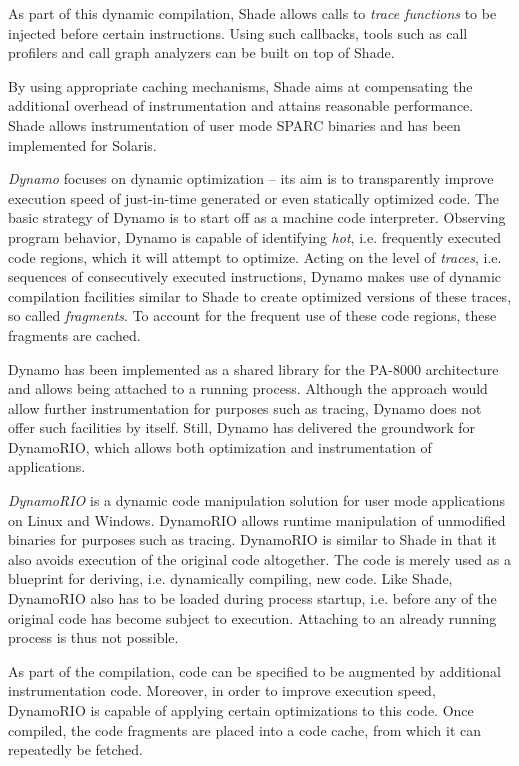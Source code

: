 As part of this dynamic compilation, Shade allows calls to \emph{trace functions} 
to be injected before certain instructions. Using such callbacks, tools such as 
call profilers and call graph analyzers can be built on top of Shade.

By using appropriate caching mechanisms, Shade aims at compensating the additional 
overhead of instrumentation and attains reasonable performance. Shade allows instrumentation
of user mode SPARC binaries and has been implemented for Solaris.

\emph{Dynamo} \cite{Dynamo00} focuses on dynamic optimization -- its aim is to transparently 
improve execution speed of just-in-time generated or even statically optimized 
code. The basic strategy of Dynamo is to start off as a machine code interpreter. 
Observing program behavior, Dynamo is capable of identifying \emph{hot}, 
i.e. frequently executed code regions, which it will attempt to optimize. 
Acting on the level of \emph{traces}, i.e. sequences of consecutively executed instructions, 
Dynamo makes use of dynamic compilation facilities similar to Shade to create optimized 
versions of these traces, so called \emph{fragments}. To account for the frequent use of 
these code regions, these fragments are cached.

Dynamo has been implemented as a shared library for the PA-8000 architecture 
and allows being attached to a running process. Although the 
approach would allow further instrumentation for purposes such as tracing,
Dynamo does not offer such facilities by itself. Still, Dynamo has delivered the groundwork
for DynamoRIO, which allows both optimization and instrumentation of applications.

\emph{DynamoRIO} \cite{Bruening04} is a dynamic code manipulation solution
for user mode applications on Linux and Windows. DynamoRIO allows runtime manipulation
of unmodified binaries for purposes such as tracing. DynamoRIO is similar
to Shade in that it also avoids execution of the original code altogether. The code is 
merely used as a blueprint for deriving, i.e. dynamically compiling, new code. Like
Shade, DynamoRIO also has to be loaded during process startup, i.e. before any
of the original code has become subject to execution. Attaching to an already running 
process is thus not possible.

As part of the compilation, code can be specified to be augmented 
by additional instrumentation code. Moreover, in order to improve execution speed, 
DynamoRIO is capable of applying certain optimizations to this code. Once compiled,
the code fragments are placed into a code cache, from which it can repeatedly be
fetched.

